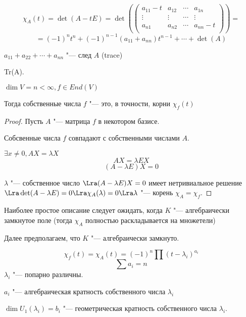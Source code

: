 $$\chi_A(t) = \det(A - tE) = \det(\begin{pmatrix}
a_{11} - t& a_{12}& \cdots & a_{1n}\\
\vdots& \vdots&\cdots&\vdots\\
a_{n1}& a_{n2} &\cdots&a_{nn} - t\\
\end{pmatrix}) = $$
$$= (-1)^{n}t^{n} + (-1)^{n - 1}(a_{11} + a_{nn})t^{n - 1} + \cdots + \det(A)$$

$a_{11} + a_{22} + \cdots + a_{nn}$ "--- след $A$ (trace)

Tr(A).

\begin{theorem}{}
$\dim V = n < \infty, f \in End(V)$

Тогда собственные числа $f$ "--- это, в точности, корни $\chi_{f}(t)$
\end{theorem}

\begin{proof}
Пусть $A$ "--- матрица $f$ в некотором базисе.

Собсвенные числа $f$ совпадают с собственными числами $A$.

$\exists x \ne 0, AX = \lambda X$
$$AX = \lambda E X $$
$$(A - \lambda E)X = 0$$

$\lambda$ "--- собственное число $\Lra (A - \lambda E)X = 0$  имеет нетривиальное
решение $\Lra \det(A - \lambda E) = 0 \Lra \chi_A(\lambda) = 0 \Lra \lambda$ "--- корень
$\chi_A = \chi_f$. 
\end{proof}

Наиболее простое описание следует ожидать, 
когда $K$ "--- алгебраически замкнутое поле
(тогда $\chi_A$ полностью раскладывается на множетели)

Далее предполагаем, что $K$ "--- алгебраически замкнуто.

$$\chi_f(t) = \chi_A(t) = (-1)^{n}\prod(t - \lambda_i)^{a_i}$$ 
$$ \sum a_i = n$$
$\lambda_i$ "--- попарно различны.

$a_i$  "--- алгебраическая кратность собственного числа $\lambda_i$

$\dim U_1(\lambda_i) = b_i$ "--- геометрическая кратность собственного числа $\lambda_i$.

